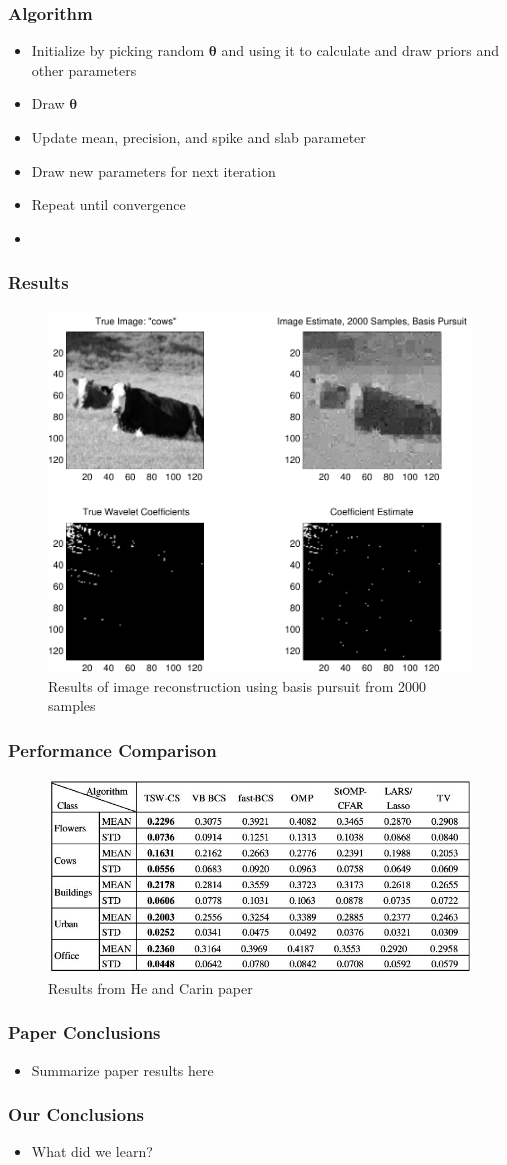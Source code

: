 \documentclass{beamer}
\newcommand{\bftheta}{\mathbf{\theta}}
\begin{document}
\begin{frame}
  \frametitle{Algorithm}
  \begin{itemize}
  \item Initialize by picking random $\bftheta$ and using it to
    calculate and draw priors and other parameters
  \item Draw $\bftheta$
  \item Update mean, precision, and spike and slab parameter
  \item Draw new parameters for next iteration
  \item Repeat until convergence
  \item
  \end{itemize}
\end{frame}

\begin{frame}
  \frametitle{Results}
\vspace{-1cm}
 \begin{figure}
    \centering
    \includegraphics[width=.65\linewidth]{cows_m2000_cvx}
    \caption{Results of image reconstruction using basis pursuit from 2000 samples}
 \end{figure}
\end{frame}

\begin{frame}
  \frametitle{Performance Comparison}
 \begin{figure}
    \centering
    \includegraphics[width=.65\linewidth]{he_carin_results_m2000}
    \caption{Results from He and Carin paper}
 \end{figure}
\end{frame}

\begin{frame}
\frametitle{Paper Conclusions}
\begin{itemize}
  \item Summarize paper results here
\end{itemize}
\end{frame}

\begin{frame}
\frametitle{Our Conclusions}
\begin{itemize}
  \item What did we learn?
\end{itemize}
\end{frame}
\end{document}
